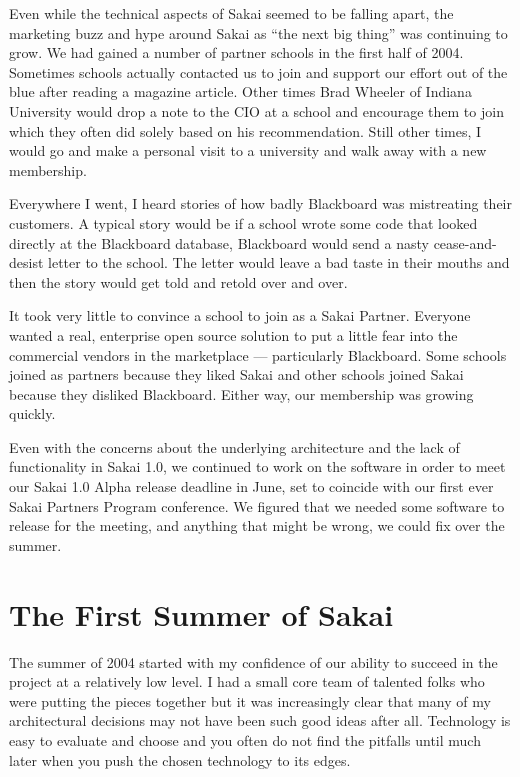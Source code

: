 \documentclass[12pt]{book}
\begin{document}
Even while the technical aspects of Sakai seemed to be falling
apart, the marketing buzz and hype around Sakai as ``the next
big thing'' was continuing to grow.   We had gained a number of
partner schools in the first half of 2004.  Sometimes schools
actually contacted us to join and support our effort out of the blue
after reading a magazine article.  Other
times Brad Wheeler of Indiana University would drop a note to the
CIO at a school and encourage them to
join which they often did solely based on his recommendation.
Still other times, I would go and make a personal visit to a
university and walk away with a new membership.

Everywhere I went, I heard stories of how badly
Blackboard was mistreating their customers.  A typical story
would be if a school wrote some code that looked directly
at the Blackboard database, Blackboard would send a nasty
cease-and-desist letter to the school. The letter would leave a
bad taste in their mouths and then the story would get
told and retold over and over.

It took very little to convince a school to
join as a Sakai Partner.
Everyone wanted a real, enterprise open source
solution to put a little fear into the commercial vendors in
the marketplace --- particularly Blackboard. Some schools joined
as partners because they liked Sakai and other schools joined
Sakai because they disliked Blackboard.  Either way, our
membership was growing quickly.

Even with the concerns about the underlying architecture
and the lack of functionality in Sakai 1.0, we continued
to work on the software in order to meet our Sakai 1.0 Alpha
release deadline in June, set to coincide with our
first ever Sakai Partners Program conference.  We figured
that we needed some software to release for the meeting,
and anything that might be wrong, we could fix
over the summer.

\chapter{The First Summer of Sakai}

The summer of 2004 started with my confidence of our ability
to succeed in the project at a relatively low level.  I had
a small core team of talented folks who were putting the
pieces together but it was increasingly clear that many
of my architectural decisions may not have been such good
ideas after all.  Technology is easy to evaluate and choose
and you often do not find the pitfalls until much later when
you push the chosen technology to its edges.
\end{document}
